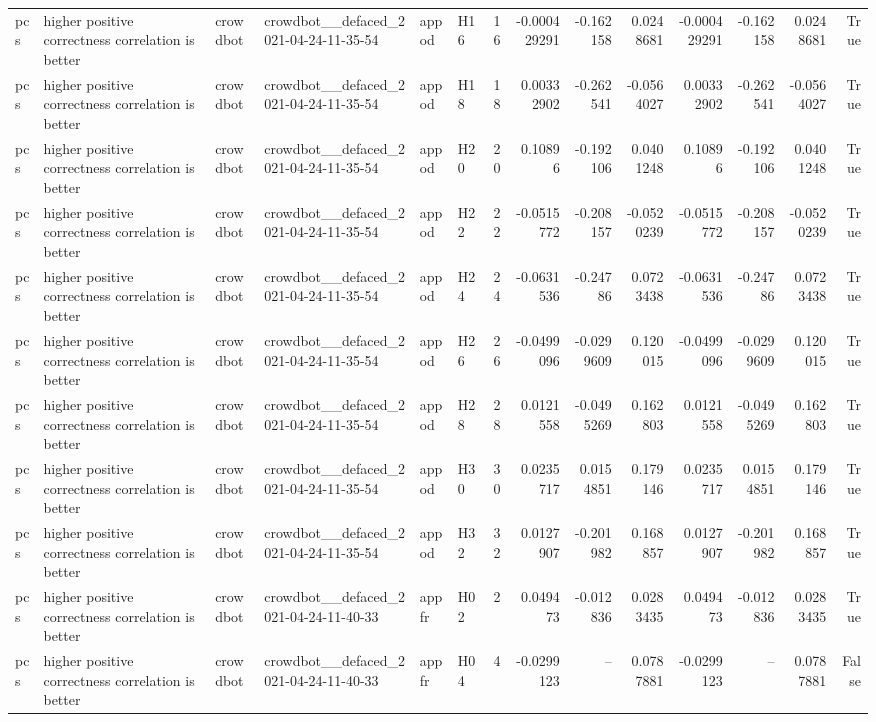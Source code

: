 \begin{longtable}{llllllrrrrrrrr}
pcs & higher positive correctness correlation is better & crowdbot & crowdbot\_\_defaced\_2021-04-24-11-35-54 & appod & H16 & 16 & -0.000429291 & -0.162158 & 0.0248681 & -0.000429291 & -0.162158 & 0.0248681 & True \\
pcs & higher positive correctness correlation is better & crowdbot & crowdbot\_\_defaced\_2021-04-24-11-35-54 & appod & H18 & 18 & 0.00332902 & -0.262541 & -0.0564027 & 0.00332902 & -0.262541 & -0.0564027 & True \\
pcs & higher positive correctness correlation is better & crowdbot & crowdbot\_\_defaced\_2021-04-24-11-35-54 & appod & H20 & 20 & 0.10896 & -0.192106 & 0.0401248 & 0.10896 & -0.192106 & 0.0401248 & True \\
pcs & higher positive correctness correlation is better & crowdbot & crowdbot\_\_defaced\_2021-04-24-11-35-54 & appod & H22 & 22 & -0.0515772 & -0.208157 & -0.0520239 & -0.0515772 & -0.208157 & -0.0520239 & True \\
pcs & higher positive correctness correlation is better & crowdbot & crowdbot\_\_defaced\_2021-04-24-11-35-54 & appod & H24 & 24 & -0.0631536 & -0.24786 & 0.0723438 & -0.0631536 & -0.24786 & 0.0723438 & True \\
pcs & higher positive correctness correlation is better & crowdbot & crowdbot\_\_defaced\_2021-04-24-11-35-54 & appod & H26 & 26 & -0.0499096 & -0.0299609 & 0.120015 & -0.0499096 & -0.0299609 & 0.120015 & True \\
pcs & higher positive correctness correlation is better & crowdbot & crowdbot\_\_defaced\_2021-04-24-11-35-54 & appod & H28 & 28 & 0.0121558 & -0.0495269 & 0.162803 & 0.0121558 & -0.0495269 & 0.162803 & True \\
pcs & higher positive correctness correlation is better & crowdbot & crowdbot\_\_defaced\_2021-04-24-11-35-54 & appod & H30 & 30 & 0.0235717 & 0.0154851 & 0.179146 & 0.0235717 & 0.0154851 & 0.179146 & True \\
pcs & higher positive correctness correlation is better & crowdbot & crowdbot\_\_defaced\_2021-04-24-11-35-54 & appod & H32 & 32 & 0.0127907 & -0.201982 & 0.168857 & 0.0127907 & -0.201982 & 0.168857 & True \\
pcs & higher positive correctness correlation is better & crowdbot & crowdbot\_\_defaced\_2021-04-24-11-40-33 & appfr & H02 & 2 & 0.049473 & -0.012836 & 0.0283435 & 0.049473 & -0.012836 & 0.0283435 & True \\
pcs & higher positive correctness correlation is better & crowdbot & crowdbot\_\_defaced\_2021-04-24-11-40-33 & appfr & H04 & 4 & -0.0299123 & -- & 0.0787881 & -0.0299123 & -- & 0.0787881 & False \\

\end{longtable}
